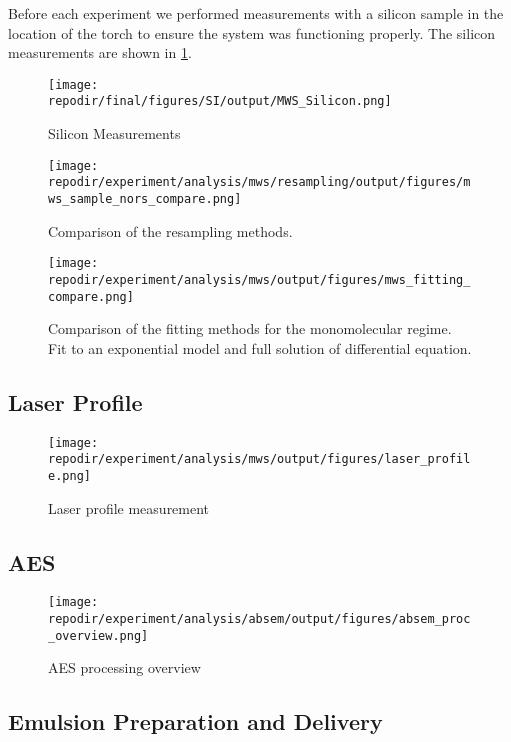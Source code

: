 Before each experiment we performed measurements with a silicon sample in the location of the torch to ensure the system was functioning properly. The silicon measurements are shown in \ref{fig:SI_MWS_Silicon}. 

\begin{figure}[]
\centering
\texttt{[image: \\repodir/final/figures/SI/output/MWS\_Silicon.png]}
\caption{Silicon Measurements}
\label{fig:SI_MWS_Silicon}
\end{figure}




\begin{figure}
\centering
\texttt{[image: \\repodir/experiment/analysis/mws/resampling/output/figures/mws\_sample\_nors\_compare.png]}
\caption{Comparison of the resampling methods.}
\label{fig:SI_mws_resampling}
\end{figure}


\begin{figure}
\centering
\texttt{[image: \\repodir/experiment/analysis/mws/output/figures/mws\_fitting\_compare.png]}
\caption{Comparison of the fitting methods for the monomolecular regime. Fit to an exponential model and full solution of differential equation. }
\label{fig:SI_mws_fitting_compare}
\end{figure}

\clearpage
\subsection{Laser Profile}


\begin{figure}[H]
\centering
\texttt{[image: \\repodir/experiment/analysis/mws/output/figures/laser\_profile.png]}
\caption{Laser profile measurement}
\label{fig:SI_Laser_Profile}
\end{figure}

\clearpage
\subsection{AES}
\begin{figure}[]
    \centering
    \texttt{[image: \\repodir/experiment/analysis/absem/output/figures/absem\_proc\_overview.png]}
    \caption{AES processing overview}
    \label{fig:SI_AES_proc_overview}
\end{figure}


\clearpage
\subsection{Emulsion Preparation and Delivery}

